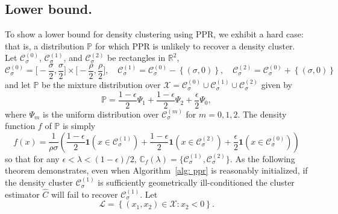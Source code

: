 \documentclass{article}
\newcommand{\Reals}{\mathbb{R}}
\newcommand{\set}[1]{\left\{#1\right\}}
\newcommand{\1}{\mathbf{1}}
\newcommand{\Cset}{\mathcal{C}}
\newcommand{\Csig}{\Cset_{\sigma}}
\newcommand{\Pbb}{\mathbb{P}}
\theoremstyle{alden}
\theoremstyle{aldenthm}
\theoremstyle{definition}
\theoremstyle{remark}
\begin{document}
\subsection{Lower bound.}
\label{sec:lower_bound}

To show a lower bound for density clustering using PPR, we exhibit a hard case: that is, a distribution $\Pbb$ for which PPR is unlikely to recover a density cluster. Let $\mathcal{C}_{\sigma}^{(0)}$, $\mathcal{C}_{\sigma}^{(1)}$, and $\mathcal{C}_{\sigma}^{(2)}$ be rectangles in $\Reals^2$, 
\begin{equation*}
\mathcal{C}_{\sigma}^{(0)} = \biggl[-\frac{\sigma}{2}, \frac{\sigma}{2}\biggr] \times \biggl[-\frac{\rho}{2}, \frac{\rho}{2}\biggr], \quad \mathcal{C}_{\sigma}^{(1)} = \mathcal{C}_{\sigma}^{(0)} - \set{(\sigma,0)}, \quad \mathcal{C}_{\sigma}^{(2)} = \mathcal{C}_{\sigma}^{(0)} + \set{(\sigma,0)} \tag{$0 < \sigma < \rho$}
\end{equation*}
and let $\mathbb{P}$ be the mixture distribution over $\mathcal{X} = \mathcal{C}_{\sigma}^{(0)} \cup \mathcal{C}_{\sigma}^{(1)} \cup \mathcal{C}_{\sigma}^{(2)}$ given by
\begin{equation*}
\mathbb{P} = \frac{1 - \epsilon}{2} \Psi_1 + \frac{1 - \epsilon}{2} \Psi_2 + \frac{\epsilon}{2} \Psi_0,
\end{equation*}
where $\Psi_m$ is the uniform distribution over $\Csig^{(m)}$ for $m = 0,1,2$. 
The density function $f$ of $\Pbb$ is simply
\begin{equation}
\label{eqn:lb_density}
f(x) = \frac{1}{\rho\sigma}\left(\frac{1 - \epsilon}{2}\1(x \in \mathcal{C}_{\sigma}^{(1)}) + \frac{1 - \epsilon}{2}\1(x \in \mathcal{C}_{\sigma}^{(2)}) + \frac{\epsilon}{2}\1(x \in \mathcal{C}_{\sigma}^{(0)})  \right)
\end{equation}
so that for any $\epsilon < \lambda < (1 - \epsilon)/2$, $\mathbb{C}_{f}(\lambda) = \{\mathcal{C}_{\sigma}^{(1)}, \mathcal{C}_{\sigma}^{(2)} \}$.
As the following theorem demonstrates, even when Algorithm~\ref{alg: ppr} is reasonably initialized, if the density cluster $\mathcal{C}_{\sigma}^{(1)}$ is sufficiently geometrically ill-conditioned the cluster estimator $\widehat{C}$ will fail to recover $\mathcal{C}_{\sigma}^{(1)}$. Let
\begin{equation}
\label{eqn:lower_set}
\mathcal{L} = \set{(x_1,x_2) \in \mathcal{X}: x_2 < 0}.
\end{equation}
\end{document}
